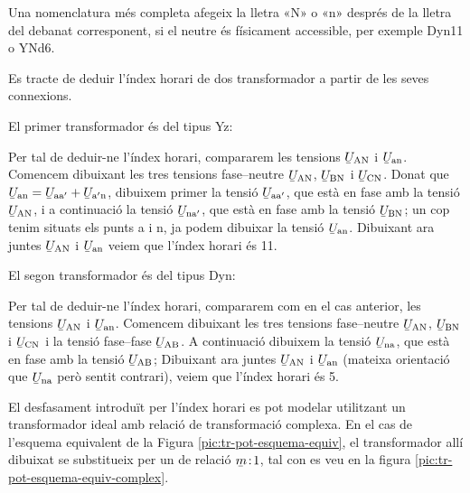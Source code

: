 Una nomenclatura més completa afegeix la lletra «N» o «n» després de la lletra del debanat corresponent, si el neutre és físicament accessible, per exemple Dyn11 o YNd6.

\begin{exemple}
    Es tracte de deduir l'índex horari de dos transformador a partir de les seves connexions.


    El primer transformador és del tipus Yz:
     \vspace{-2mm}
    \begin{center}
        
    \end{center}
     Per tal de deduir-ne l'índex horari, compararem les tensions
    $\cmplx{U}\ped{AN}$ i $\cmplx{U}\ped{an}$. Comencem dibuixant les tres tensions fase--neutre $\cmplx{U}\ped{AN}$, $\cmplx{U}\ped{BN}$ i $\cmplx{U}\ped{CN}$. Donat que $\cmplx{U}\ped{an} = \cmplx{U}\ped{aa'} + \cmplx{U}\ped{a'n}$, dibuixem primer la tensió $\cmplx{U}\ped{aa'}$, que està en fase amb la tensió $\cmplx{U}\ped{AN}$, i a continuació la tensió $\cmplx{U}\ped{na'}$, que està en fase amb la tensió $\cmplx{U}\ped{BN}$; un cop tenim situats els punts a i n, ja podem dibuixar la tensió $\cmplx{U}\ped{an}$. Dibuixant ara juntes $\cmplx{U}\ped{AN}$ i $\cmplx{U}\ped{an}$  veiem que l'índex horari és 11.


     El segon transformador és del tipus Dyn:
      \vspace{-2mm}
    \begin{center}
       
    \end{center}
      Per tal de deduir-ne l'índex horari, compararem com en el cas anterior, les tensions $\cmplx{U}\ped{AN}$ i $\cmplx{U}\ped{an}$. Comencem dibuixant les tres tensions fase--neutre $\cmplx{U}\ped{AN}$, $\cmplx{U}\ped{BN}$ i $\cmplx{U}\ped{CN}$ i la tensió fase--fase $\cmplx{U}\ped{AB}$.  A continuació dibuixem la tensió $\cmplx{U}\ped{na}$, que està en fase amb la tensió $\cmplx{U}\ped{AB}$; Dibuixant ara juntes $\cmplx{U}\ped{AN}$ i $\cmplx{U}\ped{an}$ (mateixa orientació que $\cmplx{U}\ped{na}$ però sentit contrari),  veiem que l'índex horari és 5.
\end{exemple}

El desfasament introduït per l'índex horari es pot modelar utilitzant  un transformador ideal amb relació de transformació complexa. En el cas de l'esquema equivalent de la Figura  \vref{pic:tr-pot-esquema-equiv}, el transformador allí dibuixat
se substitueix per un de relació $\cmplx{m}\!:\!1$, tal con es veu en la figura \vref{pic:tr-pot-esquema-equiv-complex}.


